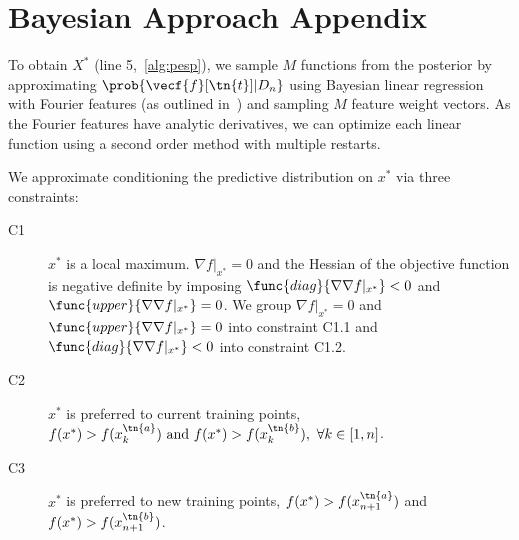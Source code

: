 \hypertarget{sec:appendix}{\section*{Bayesian Approach Appendix}}

To obtain $X^*$ (line 5,~\cref{alg:pesp}), we sample $M$ functions from the
posterior by approximating $\prob{\vecf{f}[\tn{t}]|D_n}$ using Bayesian linear
regression with Fourier features (as outlined in~\citep{hernandez2014predictive})
and sampling $M$ feature weight vectors. As the Fourier features have analytic
derivatives, we can optimize each linear function using a second order method
with multiple restarts.

We approximate conditioning the predictive distribution on $x^*$ via three
constraints: 
\begin{description} 
    \item[C1] $x^*$ is a local maximum. $\nabla f|_{x^*} = 0$ and the
    Hessian of the objective function is negative definite by imposing
    $\func{diag}{\nabla \nabla f|_{x^*}} < 0$ and $\func{upper}{\nabla
    \nabla f|_{x^*}} = 0$. We group $\nabla f|_{x^*} = 0$ and
    $\func{upper}{\nabla \nabla f|_{x^*}} = 0$ into constraint C1.1 and
    $\func{diag}{\nabla \nabla f|_{x^*}} < 0$ into constraint C1.2.

    \item[C2] $x^*$ is preferred to current training points, $f(x^*) >
    f(x_k^\tn{a}) \textrm{ and }  f(x^*) > f(x_k^\tn{b}), \ \forall k \in [1,
    n]$.

    \item[C3] $x^*$ is preferred to new training points, $f(x^*) >
    f(x_{n+1}^\tn{a})$ and $f(x^*) > f(x_{n+1}^\tn{b})$.  
\end{description}

